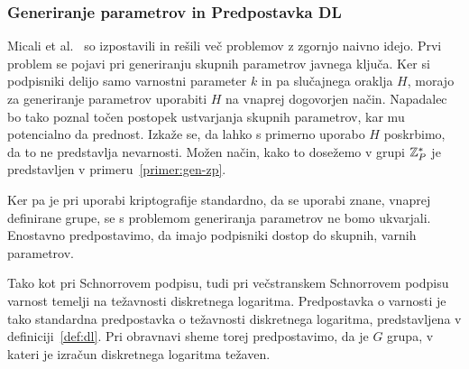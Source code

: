 \subsubsection{Generiranje parametrov in Predpostavka DL}
Micali et al.~\cite{micali2001asm} so izpostavili in rešili več problemov z zgornjo naivno idejo.
Prvi problem se pojavi pri generiranju skupnih parametrov javnega ključa. Ker si podpisniki
delijo samo varnostni parameter $k$ in pa slučajnega oraklja $H$, morajo za generiranje parametrov uporabiti
$H$ na vnaprej dogovorjen način. Napadalec bo tako poznal točen postopek ustvarjanja skupnih
parametrov, kar mu potencialno da prednost. Izkaže se, da lahko s primerno uporabo $H$ poskrbimo,
da to ne predstavlja nevarnosti. Možen način, kako to dosežemo v grupi $\mathbb Z_P^*$ je predstavljen v
primeru~\ref{primer:gen-zp}.

Ker pa je pri uporabi kriptografije standardno, da se uporabi znane, vnaprej definirane grupe, se
s problemom generiranja parametrov ne bomo ukvarjali. Enostavno predpostavimo, da imajo podpisniki
dostop do skupnih, varnih parametrov.

Tako kot pri Schnorrovem podpisu, tudi pri večstranskem Schnorrovem podpisu varnost temelji na
težavnosti diskretnega logaritma. Predpostavka o varnosti je tako standardna predpostavka o težavnosti
diskretnega logaritma, predstavljena v definiciji~\ref{def:dl}. Pri obravnavi sheme torej predpostavimo,
da je $G$ grupa, v kateri je izračun diskretnega logaritma težaven.

